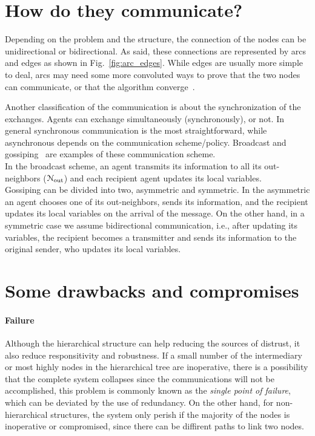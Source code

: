 \documentclass[../main.tex]{subfiles}
\begin{document}
\section{How do they communicate?}
Depending on the problem and the structure, the connection of the nodes can be unidirectional or bidirectional. As said, these connections are represented by arcs and edges as shown in Fig.~\ref{fig:arc_edges}.
While edges are usually more simple to deal, arcs may need some more convoluted ways to prove that the two nodes can communicate, or that the algorithm converge~\cite{GarinSchenato2010}.

Another classification of the communication is about the synchronization of the exchanges. Agents can exchange simultaneously (synchronously), or not. In general synchronous communication is the most straightforward, while asynchronous depends on the communication scheme/policy. Broadcast and gossiping~\cite{GarinSchenato2010} are examples of these communication scheme.
\\In the broadcast scheme, an agent transmits its information to all its out-neighbors ($\mathcal{N}_{\text{out}}$) and each recipient agent updates its local variables.
\\Gossiping can be divided into two, asymmetric and symmetric.
In the asymmetric an agent chooses one of its out-neighbors, sends its information, and the recipient updates its local variables on the arrival of the message.
On the other hand, in a symmetric case we assume bidirectional communication, i.e., after updating its variables, the recipient becomes a transmitter and sends its information to the original sender, who updates its local variables.


\section{Some drawbacks and compromises}\label{sec:drawbacks}

\paragraph{Failure}
Although the hierarchical structure can help reducing the sources of distrust, it also reduce responsitivity and robustness.
If a small number of the intermediary or most highly nodes in the hierarchical tree are inoperative, there is a possibility that the complete system collapses since the communications will not be accomplished, this problem is commonly known as the \emph{single point of failure}, which can be deviated by the use of redundancy.
On the other hand, for non-hierarchical structures, the system only perish if the majority of the nodes is inoperative or compromised, since there can be diffirent paths to link two nodes.
\end{document}
